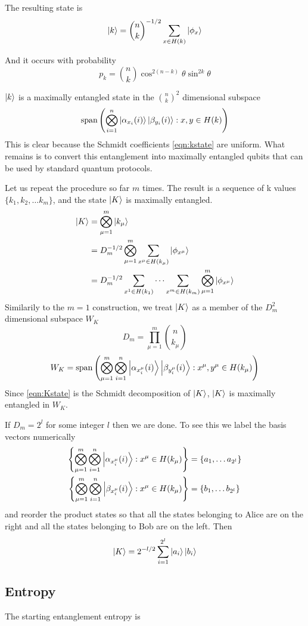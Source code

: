 The resulting state is
\begin{equation}
\label{eqn:kstate}
\ket{k} = \binom{n}{k}^{-1/2} \sum_{x \in H(k)} \ket{\phi_x}
\end{equation}

And it occurs with probability
$$
p_k = \binom{n}{k} \cos^{2(n-k)}\theta \sin^{2k}\theta
$$

$\ket{k}$ is a maximally entangled state in the $\binom{n}{k}^2$ dimensional subspace 
$$\text{span}\left(\bigotimes_{i=1}^n 
\ket{\alpha_{x_i}(i)} \ket{\beta_{y_i}(i)}: x,y \in H(k)\right)
$$
This is clear because the Schmidt coefficients \eqref{eqn:kstate} are uniform.
What remains is to convert this entanglement into maximally entangled qubits that can be used by standard quantum protocols. 

Let us repeat the procedure so far $m$ times. The result is a sequence of k values $\{k_1, k_2,\ldots k_m \}$, and the state
$\ket{K}$ is maximally entangled.
\begin{align}
\ket{K} &= \bigotimes_{\mu=1}^m \ket{k_\mu} \\
&= D_m^{-1/2} \bigotimes_{\mu=1}^m \sum_{x^\mu \in H(k_\mu)} \ket{\phi_{x^\mu}} \\
\label{eqn:Kstate}
&=  D_m^{-1/2} \sum_{x^1 \in H(k_1)} \cdots \sum_{x^m \in H(k_m)} \bigotimes_{\mu=1}^m  \ket{\phi_{x^\mu}}
\end{align}
Similarily to the $m=1$ construction, we treat $\ket{K}$ as a member of the $D_m^2$ dimensional subspace $W_K$
\begin{equation}
D_m = \prod_{\mu=1}^{m} \binom{n}{k_\mu}
\end{equation}
\begin{equation}
\label{eqn:Wk}
W_K = \text{span}\left(\bigotimes_{\mu=1}^m\bigotimes_{i=1}^n 
\ket{\alpha_{x_i^\mu}(i)} \ket{\beta_{y_i^\mu}(i)}: x^\mu,y^\mu \in H(k_\mu)\right)
\end{equation}
Since \eqref{eqn:Kstate} is the Schmidt decomposition of $\ket{K}$, $\ket{K}$ is maximally entangled in $W_K$.

If $D_m = 2^l$ for some integer $l$ then we are done. To see this we label the basis vectors numerically
\begin{align}
\left\{
\bigotimes_{\mu=1}^m\bigotimes_{i=1}^n 
\ket{\alpha_{x_i^\mu}(i)}: x^\mu \in H(k_\mu) 
\right\} &= \{a_1, \ldots a_{2^l}\} \\
\left\{
\bigotimes_{\mu=1}^m\bigotimes_{i=1}^n 
\ket{\beta_{x_i^\mu}(i)}: x^\mu \in H(k_\mu) 
\right\} &= \{b_1, \ldots b_{2^l}\} 
\end{align}
and reorder the product states so that all the states belonging to Alice are on the right and all the states belonging to Bob are on the left. Then
\begin{equation}
	\ket{K} = 2^{-l/2}\sum_{i=1}^{2^l} \ket{a_i}\ket{b_i}
\end{equation}


\subsection{Entropy}
The starting entanglement entropy is

